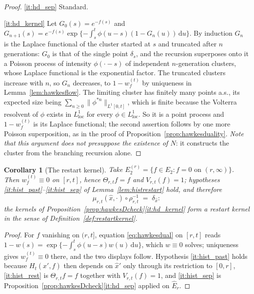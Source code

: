\documentclass[11pt,a4paper]{article}
\theoremstyle{plain}
\newtheorem{corollary}[theorem]{Corollary}
\theoremstyle{definition}
\theoremstyle{remark}
\newcommand{\dif}{\,\mathrm{d}}
\begin{document}
\begin{proof}
  \ref{it:hd_sep}  Standard.

  \ref{it:hd_kernel}  Let $G_0(s) = e^{-f(s)}$ and
  $G_{n+1}(s) = e^{-f(s)}\exp\{-\int_s^t\phi(u-s)(1-G_n(u))\dif u\}$.  By
  induction $G_n$ is the Laplace functional of the cluster started at $s$ and
  truncated after $n$ generations: $G_0$ is that of the single point $\delta_s$,
  and the recursion superposes onto it a Poisson process of intensity
  $\phi(\cdot - s)$ of independent $n$-generation clusters, whose Laplace
  functional is the exponential factor.  The truncated clusters increase with
  $n$, so $G_n$ decreases, to $1 - w^{(t)}_f$ by uniqueness in
  Lemma~\ref{lem:hawkesflow}.  The limiting cluster has finitely many points a.s.,
  its expected size being $\sum_{n\geq 0}\lVert \phi^{*n}\rVert_{L^1[0,t]}$, which is
  finite because the Volterra resolvent of $\phi$ exists in
  $L^1_{\mathrm{loc}}$ for every $\phi \in L^1_{\mathrm{loc}}$.  So it is a point
  process and $1 - w^{(t)}_f$ is its Laplace functional; the second assertion
  follows by one more Poisson superposition, as in the proof of
  Proposition~\ref{prop:hawkesduality}.  \emph{Note that this argument does not
  presuppose the existence of $N$}: it constructs the cluster from the branching
  recursion alone.
\end{proof}

\begin{corollary}[The restart kernel]
  \label{cor:hawkesrestart}
  Take $E_2^{(r)} = \{f \in E_2 : f = 0 \text{ on } (r,\infty)\}$.  Then
  $w^{(t)}_f \equiv 0$ on $[r,t]$, hence $\Theta_{r,t}f = f$ and
  $V_{r,t}(f) = 1$; hypotheses \ref{it:hist_past}--\ref{it:hist_sep} of
  Lemma~\ref{lem:histrestart} hold, and therefore
  \[
    \mu_{r,t}(\hat{x},\cdot) \circ \rho_{r,t}^{-1} \;=\; \delta_{\hat{x}} :
  \]
  the kernels of Proposition~\ref{prop:hawkesDcheck}\ref{it:hd_kernel} form a
  restart kernel in the sense of Definition~\ref{def:restartkernel}.
\end{corollary}

\begin{proof}
  For $f$ vanishing on $(r,t]$, equation \eqref{eq:hawkesdual} on $[r,t]$ reads
  $1 - w(s) = \exp\{-\int_s^t\phi(u-s)w(u)\dif u\}$, which $w \equiv 0$ solves;
  uniqueness gives $w^{(t)}_f \equiv 0$ there, and the two displays follow.
  Hypothesis \ref{it:hist_past} holds because $H_t(\hat{x}',f)$ then depends on
  $\hat{x}'$ only through its restriction to $[0,r]$, \ref{it:hist_rest} is
  $\Theta_{r,t}f = f$ together with $V_{r,t}(f) = 1$, and \ref{it:hist_sep} is
  Proposition~\ref{prop:hawkesDcheck}\ref{it:hd_sep} applied on $\hat{E}_r$.
\end{proof}
\end{document}
